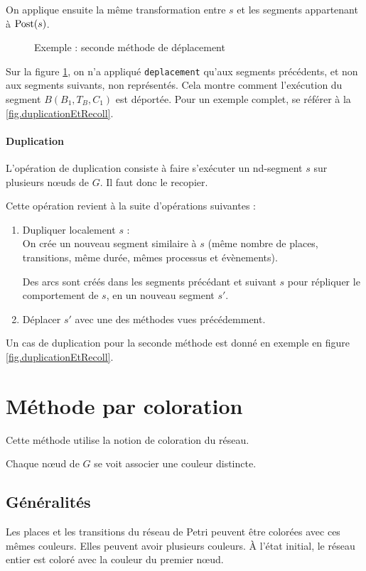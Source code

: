 On applique ensuite la même transformation entre $s$ et les segments appartenant à $\operatorname{Post}(s)$.

\begin{figure}[H]
\centering

\caption{Exemple : seconde méthode de déplacement}
\label{fig:deplacementForm2}
\end{figure}

Sur la figure \ref{fig:deplacementForm2}, on n'a appliqué \texttt{deplacement} qu'aux segments précédents, et non aux segments suivants, non représentés.
Cela montre comment l'exécution du segment $B(B_1, T_B, C_1)$ est déportée.
Pour un exemple complet, se référer à la \cref{fig.duplicationEtRecoll}.

\paragraph{Duplication}
L'opération de duplication consiste à faire s'exécuter un nd-segment $s$ sur plusieurs nœuds de $G$. Il faut donc le recopier.

Cette opération revient à la suite d'opérations suivantes : 
\begin{enumerate}
\item Dupliquer localement $s$ : \\
		On crée un nouveau segment similaire à $s$ (même nombre de places, transitions, même durée, mêmes processus et évènements).
		
		Des arcs sont créés dans les segments précédant et suivant $s$ pour répliquer le comportement de $s$, en un nouveau segment $s'$.
\item Déplacer $s'$ avec une des méthodes vues précédemment.
\end{enumerate}

Un cas de duplication pour la seconde méthode est donné en exemple en figure \ref{fig.duplicationEtRecoll}.

\section{Méthode par coloration}
Cette méthode utilise la notion de coloration du réseau.

Chaque nœud de $G$ se voit associer une couleur distincte.

\subsection{Généralités}
Les places et les transitions du réseau de Petri peuvent être colorées avec ces mêmes couleurs. Elles peuvent avoir plusieurs couleurs.
À l'état initial, le réseau entier est coloré avec la couleur du premier nœud.

